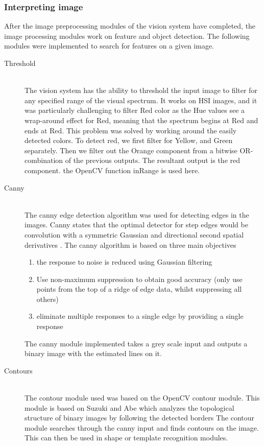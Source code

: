 \subsubsection{Interpreting image} 
After the image preprocessing modules of the vision system have completed, the image processing modules work on feature and object detection. The following modules were implemented to search for features on a given image. 
\begin{description}
\item[Threshold]\hfill \\
The vision system has the ability to threshold the input image to filter for any specified range of the visual spectrum. 
It works on HSI images, and it was particularly challenging to filter Red color as the Hue values see a wrap-around effect for Red, meaning that the spectrum begins at Red and ends at Red.
This problem was solved by working around the easily detected colors.
To detect red, we first filter for Yellow, and Green separately. Then we filter out the Orange component from a bitwise OR-combination of the previous outputs. The resultant output is the red component.
the OpenCV function inRange is used here.

\item[Canny]\hfill \\
The canny edge detection algorithm \cite{Canny:1986:CAE:11274.11275}  was used for detecting edges in the images. Canny states that the optimal detector for step edges would be convolution with a symmetric Gaussian and directional second spatial derivatives \cite{books/sp/Cipolla96}. The canny algorithm is based on three main objectives \cite{Nixon:2008:FEI:1571711}
\begin{enumerate}
  \item the response to noise is reduced using Gaussian filtering
  \item Use non-maximum suppression to obtain good accuracy (only use points from the top of a ridge of edge data, whilst suppressing all others)
  \item eliminate multiple responses to a single edge by providing a single response
\end{enumerate}

The canny module implemented takes a grey scale input and outputs a binary image with the estimated lines on it.

\item[Contours]\hfill \\
The contour module used was based on the OpenCV contour module. This module is based on Suzuki and Abe which analyzes the topological structure of binary
images by following the detected borders \cite{article:suzuki} 
The contour module searches through the canny input and finds contours on the image. This can then be used in shape or template recognition modules.


\end{description}
